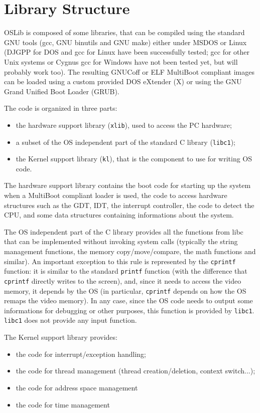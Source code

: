 \documentclass[a4paper]{report}
\begin{document}
\section{Library Structure}
OSLib is composed of some libraries, that can be compiled using
the standard GNU tools (gcc, GNU binutils and GNU make) either under
MSDOS or Linux (DJGPP for DOS and
gcc for Linux have been successfully tested; gcc for other Unix
systems or Cygnus gcc for Windows have not been tested yet, but
will probably work too). The resulting GNUCoff or ELF MultiBoot compliant
images can be loaded using a custom provided DOS eXtender (X) or
using the GNU Grand Unified Boot Loader (GRUB).

The code is organized in three parts: \begin{itemize}
\item the hardware support library ({\tt xlib}), used to access the PC
	hardware;
\item a subset of the OS independent part of the standard C library
	({\tt libc1});
\item the Kernel support library ({\tt kl}), that is the component to
	use for writing OS code.
\end{itemize}

The hardware support library contains the boot code for starting up
the system when a MultiBoot compliant loader is used, the code to
access hardware structures such as the GDT, IDT, the interrupt
controller, the code to detect the CPU, and some data structures
containing informations about the system.

The OS independent part of the C library provides all the functions
from libc that can be implemented without invoking system calls
(typically the string management functions, the memory
copy/move/compare, the math functions and similar). An important
exception to this rule is represented by the {\tt cprintf} function:
it is similar to the standard {\tt printf} function (with the
difference that {\tt cprintf} directly writes to the screen), and,
since it needs to access the video memory, it depends by the OS (in
particular, {\tt cprintf} depends on how the OS remaps the video
memory). In any case, since the OS code needs to output some
informations for debugging or other purposes, this function is
provided by {\tt libc1}. {\tt libc1} does not provide any input
function.

The Kernel support library provides: \begin{itemize}
\item the code for interrupt/exception handling;
\item the code for thread management (thread creation/deletion,
	context switch...);
\item the code for address space management
\item the code for time management
\end{itemize}
\end{document}
